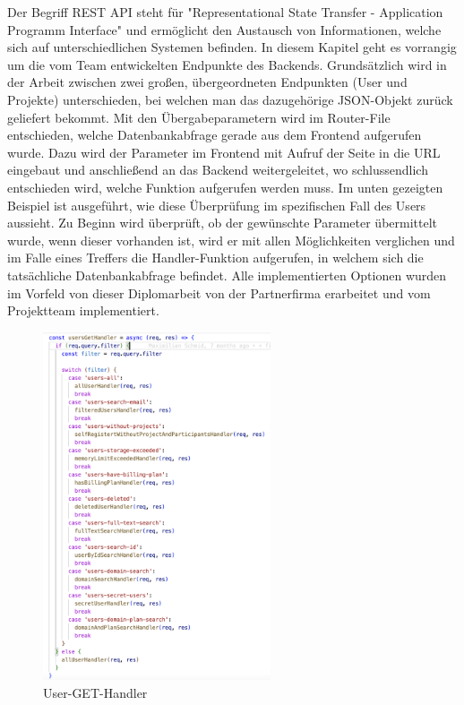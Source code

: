 Der Begriff REST API steht für "Representational State Transfer - Application Programm Interface" und ermöglicht den Austausch von Informationen, welche sich auf unterschiedlichen Systemen befinden. In diesem Kapitel geht es vorrangig um die vom Team entwickelten Endpunkte des Backends. Grundsätzlich wird in der Arbeit zwischen zwei großen, übergeordneten Endpunkten (User und Projekte) unterschieden, bei welchen man das dazugehörige JSON-Objekt zurück geliefert bekommt. Mit den Übergabeparametern wird im Router-File entschieden, welche Datenbankabfrage gerade aus dem Frontend aufgerufen wurde. Dazu wird der Parameter im Frontend mit Aufruf der Seite in die URL eingebaut und anschließend an das Backend weitergeleitet, wo schlussendlich entschieden wird, welche Funktion aufgerufen werden muss.
\newline
Im unten gezeigten Beispiel ist ausgeführt, wie diese Überprüfung im spezifischen Fall des Users aussieht. Zu Beginn wird überprüft, ob der gewünschte Parameter übermittelt wurde, wenn dieser vorhanden ist, wird er mit allen Möglichkeiten verglichen und im Falle eines Treffers die Handler-Funktion aufgerufen, in welchem sich die tatsächliche Datenbankabfrage befindet. Alle implementierten Optionen wurden im Vorfeld von dieser Diplomarbeit von der Partnerfirma erarbeitet und vom Projektteam implementiert.
\newline
\begin{figure}[h!]
    \centering
    \includegraphics[width=0.6\textwidth]{pics/REST_API_Img.png}
    \caption{User-GET-Handler}
    \label{fig:enter-label}
\end{figure}